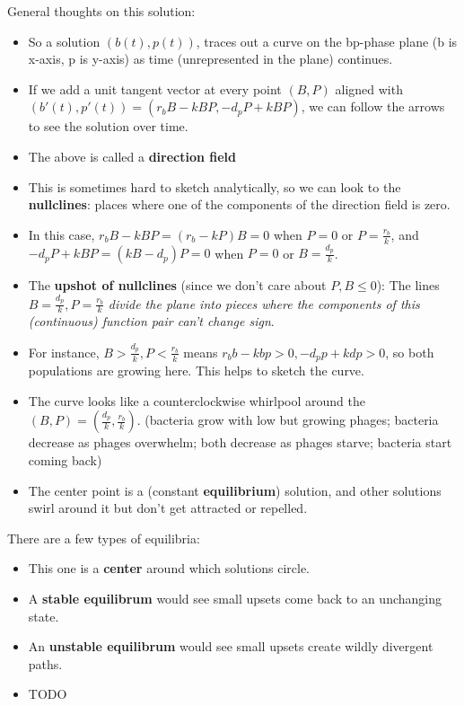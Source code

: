 \documentclass[11pt, oneside]{article}   	%
\begin{document}
General thoughts on this solution:
\begin{itemize}
\item So a solution $(b(t), p(t))$, traces out a curve on the bp-phase plane (b is x-axis, p is y-axis) as time (unrepresented in the plane) continues.
\item If we add a unit tangent vector at every point $(B, P)$ aligned with $(b'(t), p'(t)) = ( r_bB - kBP, -d_p P + kBP)$, we can follow the arrows to see the solution over time.
\item The above is called a \textbf{direction field}
\item This is sometimes hard to sketch analytically, so we can look to the \textbf{nullclines}: places where one of the components of the direction field is zero.
\item In this case, $r_bB - kBP = (r_b-kP)B = 0$ when $P = 0$ or $P = \frac{r_b}{k}$, and $-d_p P + kBP = (kB-d_p)P = 0$ when $P=0$ or $B = \frac{d_p}{k}$.
\item The \textbf{upshot of nullclines} (since we don't care about $P, B \leq 0$): The lines $B = \frac{d_p}{k}, P = \frac{r_b}{k}$ \emph{divide the plane into pieces where the components of this (continuous) function pair can't change sign}.  
\item For instance, $B > \frac{d_p}{k}, P <  \frac{r_b}{k}$  means $r_b b - kbp > 0, -d_p p+ kdp > 0$, so both populations are growing here.  This helps to sketch the curve.
\item The curve looks like a counterclockwise whirlpool around the $(B, P) = ( \frac{d_p}{k}, \frac{r_b}{k})$.  (bacteria grow with low but growing phages; bacteria decrease as phages overwhelm; both decrease as phages starve; bacteria start coming back)
\item The center point is a (constant \textbf{equilibrium}) solution, and other solutions swirl around it but don't get attracted or repelled.
\end{itemize}

There are a few types of equilibria:
\begin{itemize}
\item This one is a \textbf{center} around which solutions circle.
\item A \textbf{stable equilibrum} would see small upsets come back to an unchanging state.
\item An \textbf{unstable equilibrum} would see small upsets create wildly divergent paths.


\end{itemize}





\begin{itemize}
\item TODO
\end{itemize}
\end{document}
